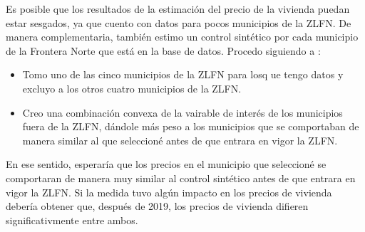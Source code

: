 Es posible que los resultados de la estimación del precio de la vivienda puedan estar sesgados, ya que cuento con datos para pocos municipios de la ZLFN. De manera complementaria, también estimo un control sintético por cada municipio de la Frontera Norte que está en la base de datos. Procedo siguiendo a \cite{abadie_comparative_2014}:

\begin{itemize}
\item Tomo uno de las cinco municipios de la ZLFN para losq ue tengo datos y excluyo a los otros cuatro municipios de la ZLFN.

\item Creo una combinación convexa de la vairable de interés de los municipios fuera de la ZLFN, dándole más peso a los municipios que se comportaban de manera similar al que seleccioné antes de que entrara en vigor la ZLFN. 
\end{itemize}

En ese sentido, esperaría que los precios en el municipio que seleccioné se comportaran de manera muy similar al control sintético antes de que entrara en vigor la ZLFN. Si la medida tuvo algún impacto en los precios de vivienda debería obtener que, después de 2019, los precios de vivienda difieren significativmente entre ambos.

